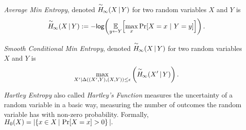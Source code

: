 \begin{definition}
    \emph{Average Min Entropy}, denoted $\overset{\sim}{H}\!_{\infty}\!\left(X\,|\,Y\right)$ for two random variables $X$ and $Y$ is \[ \overset{\sim}{H}\!_{\infty}\!\left(X\,|\,Y\right) := -\mathsf{log}\!\left(\operatorname*{\mathbb{E}}\limits_{y \leftarrow Y}\!\left[\max\limits_{x} \Pr\!\left[X = x\ |\ Y = y\right]\right]\right).\] 
\end{definition}

\begin{definition}
    \emph{Smooth Conditional Min Entropy}, denoted $\overset{\sim}{H}\!_{\infty}\!\left(X\,|\,Y\right)$ for two random variables $X$ and $Y$ is \[\max_{X' | \Delta((X', Y), (X, Y))\le \epsilon} \left( \overset{\sim}{H}\!_{\infty}\!\left(X'\,|\,Y\right)\right).
    \] 
\end{definition}


\begin{definition}
    \emph{Hartley Entropy} also called \emph{Hartley's Function} measures the uncertainty of a random variable in a basic way, measuring the number of outcomes the random variable has with non-zero probability. Formally, $
    H_0\!\left(X\right) = | \!\left\{ x \in X\,|\, \Pr\!\left[X = x\right] > 0 \right\}|.
    $
\end{definition}

